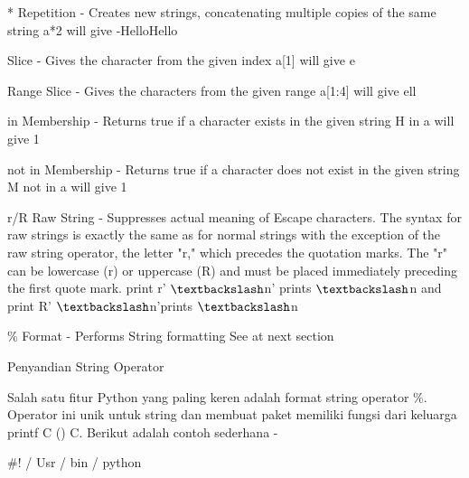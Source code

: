 * \hspace*{0.5in} Repetition - Creates new strings, concatenating multiple copies of the same string \hspace*{0.5in} a*2 will give -HelloHello \par
[] \hspace*{0.5in} Slice - Gives the character from the given index \hspace*{0.5in} a[1] will give e \par
[ : ] \hspace*{0.5in} Range Slice - Gives the characters from the given range \hspace*{0.5in} a[1:4] will give ell \par
in \hspace*{0.5in} Membership - Returns true if a character exists in the given string \hspace*{0.5in} H in a will give 1 \par
not in  \hspace*{0.5in} Membership - Returns true if a character does not exist in the given string \hspace*{0.5in} M not in a will give 1 \par
r/R \hspace*{0.5in} Raw String - Suppresses actual meaning of Escape characters. The syntax for raw strings is exactly the same as for normal strings with the exception of the raw string operator, the letter "r," which precedes the quotation marks. The "r" can be lowercase (r) or uppercase (R) and must be placed immediately preceding the first quote mark. \hspace*{0.5in} print r' $  \textbackslash  $n' prints  $  \textbackslash  $n and print R' $  \textbackslash  $n'prints  $  \textbackslash  $n \par
 $  \%  $ \hspace*{0.5in} Format - Performs String formatting \hspace*{0.5in} See at next section \par
\vspace{12pt}
\vspace{12pt}
Penyandian String Operator \par
Salah satu fitur Python yang paling keren adalah format string operator $  \%  $. Operator ini unik untuk string dan membuat paket memiliki fungsi dari keluarga printf C () C. Berikut adalah contoh sederhana - \par
 $  \#  $! / Usr / bin / python \par
